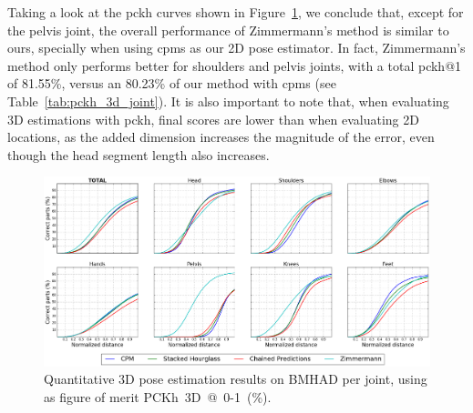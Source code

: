 Taking a look at the \gls{pckh} curves shown in Figure~\ref{fig:pckh_3d}, we conclude that, except for the pelvis joint, the overall performance of Zimmermann's method is similar to ours, specially when using \glspl{cpm} as our 2D pose estimator. In fact, Zimmermann's method only performs better for shoulders and pelvis joints, with a total \gls{pckh}@1 of 81.55\%, versus an 80.23\% of our method with \glspl{cpm} (see Table~\ref{tab:pckh_3d_joint}). It is also important to note that, when evaluating 3D estimations with \gls{pckh}, final scores are lower than when evaluating 2D locations, as the added dimension increases the magnitude of the error, even though the head segment length also increases.

\begin{figure}[h]
    \centering
    \includegraphics[width=\textwidth]{figures/pckh_3d.png}
    \caption{Quantitative 3D pose estimation results on BMHAD per joint, using as figure of merit PCKh~3D~@~0-1~(\%).}
    \label{fig:pckh_3d}
\end{figure}

\begin{table}[!ht]  
  \centering
  \caption{Quantitative 3D pose estimation results on BMHAD per joint, using as figure of merit PCKh~3D~@~1~(\%). Values in bold correspond to the best results achieved for each category.}
  \label{tab:pckh_3d_joint}
\end{table}

